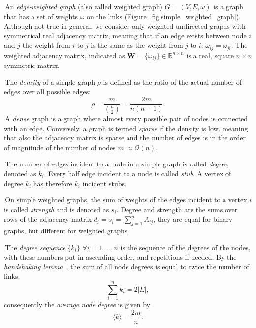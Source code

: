 \documentclass[11pt,              a4paper,              twoside,openright,              titlepage,              headinclude,footinclude,                            numbers=noenddot,              cleardoublepage=empty,]{scrreprt}
\begin{document}
\noindent\textbullet \,An \emph{edge-weighted graph} (also called weighted graph) $G=(V,E,\omega)$ is a graph that has a set of weights $\omega$ on the links (Figure~\ref{fig:simple_weighted_graph}).
Although not true in general, we consider only weighted undirected graphs with symmetrical real adjacency matrix, meaning that if an edge exists between node $i$ and $j$ the weight from $i$ to $j$ is the same as the weight from $j$ to $i$: $\omega_{ij}=\omega_{ji}$.
The weighted adjacency matrix,  indicated as $\mathbf{W}=\{ \omega_{ij} \} \in \mathbb{R}^{n\times n}$ is a real, square $n \times n$ symmetric matrix.

\noindent\textbullet \,The \emph{density} of a simple graph $\rho$ is defined as the ratio of the actual number of edges over all possible edges:
\begin{equation}
\rho = \frac{m}{\binom{n}{2}} = \frac{2m}{n(n-1)}.
\end{equation}
\noindent\textbullet \,A \emph{dense} graph is a graph where almost every possible pair of nodes is connected with an edge.
Conversely, a graph is termed \emph{sparse} if the density is low, meaning that also the adjacency matrix is sparse and the number of edges is in the order of magnitude of the number of nodes $m ~\approx \mathcal{O}(n)$.

\noindent\textbullet \,The number of edges incident to a node in a simple graph is called \emph{degree}, denoted as $k_i$.
Every half edge incident to a node is called \emph{stub}. A vertex of degree $k_i$ has therefore $k_i$ incident stubs.

\noindent\textbullet \,On simple weighted graphs, the sum of weights of the edges incident to a vertex $i$ is called \emph{strength} and is denoted as $s_i$.
Degree and strength are the sums over rows of the adjacency matrix $d_i=s_i=\sum_{j=1}^n A_{ij}$, they are equal for binary graphs, but different for weighted graphs.

\noindent\textbullet \,The \emph{degree sequence} $\{k_i\}$ $\forall i=1,\ldots,n$ is the sequence  of the degrees of the nodes, with these numbers put in ascending order, and repetitions if needed.
By the \emph{handshaking lemma}~\cite{leiserson2001}, the sum of all node degrees is equal to twice the number of links:
\begin{equation}
\label{eq:handshaking_lemma}
\sum_{i=1}^n k_i=2 |E|,
\end{equation}
consequently the \emph{average node degree} is given by
\begin{equation}
\langle  k \rangle = \frac{2m}{n}.
\end{equation}
\end{document}
